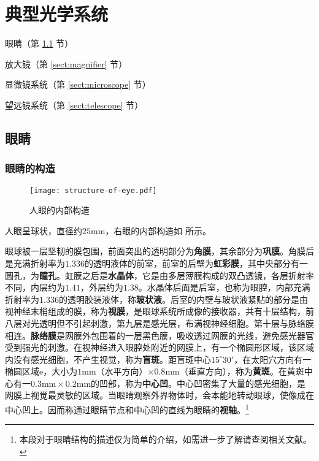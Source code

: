 \chapter{典型光学系统}

\begin{introduction}
	\item 眼睛（第 \ref{sect:eye} 节）
	\item 放大镜（第 \ref{sect:magnifier} 节）
	\item 显微镜系统（第 \ref{sect:microscope} 节）
	\item 望远镜系统（第 \ref{sect:telescope} 节）
\end{introduction}

\section{眼睛}
\label{sect:eye}
\subsection{眼睛的构造}

\begin{figure}[htbp]
	\centering
	\texttt{[image: structure-of-eye.pdf]}
	\caption{人眼的内部构造}
	\label{fig:structure-of-eye}
\end{figure}

人眼呈球状，直径约$25\mathrm{mm}$，右眼的内部构造如 所示。

眼球被一层坚韧的膜包围，前面突出的透明部分为\textbf{角膜}，其余部分为\textbf{巩膜}。角膜后是充满折射率为$1.336$的透明液体的前室，前室的后壁为\textbf{虹彩膜}，其中央部分有一圆孔，为\textbf{瞳孔}。虹膜之后是\textbf{水晶体}，它是由多层薄膜构成的双凸透镜，各层折射率不同，内层约为$1.41$，外层约为$1.38$。水晶体后面是后室，也称为眼腔，内部充满折射率为$1.336$的透明胶装液体，称\textbf{玻状液}。后室的内壁与玻状液紧贴的部分是由视神经末梢组成的膜，称为\textbf{视膜}，是眼球系统所成像的接收器，共有十层结构，前八层对光透明但不引起刺激，第九层是感光层，布满视神经细胞。第十层与脉络膜相连。\textbf{脉络膜}是网膜外包围着的一层黑色膜，吸收透过网膜的光线，避免感光器官受到强光的刺激。在视神经进入眼腔处附近的网膜上，有一个椭圆形区域，该区域内没有感光细胞，不产生视觉，称为\textbf{盲斑}。距盲斑中心$15^{\circ}30'$，在太阳穴方向有一椭圆区域e，大小为$1\mathrm{mm}$（水平方向）$\times0.8\mathrm{mm}$（垂直方向），称为\textbf{黄斑}。在黄斑中心有一$0.3\mathrm{mm}\times0.2\mathrm{mm}$的凹部，称为\textbf{中心凹}。中心凹密集了大量的感光细胞，是网膜上视觉最灵敏的区域。当眼睛观察外界物体时，会本能地转动眼球，使像成在中心凹上。因而称通过眼睛节点和中心凹的直线为眼睛的\textbf{视轴}。\footnote{本段对于眼睛结构的描述仅为简单的介绍，如需进一步了解请查阅相关文献。}

